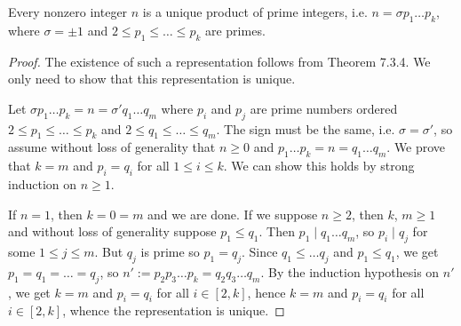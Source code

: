\begin{thmbox}
   Every nonzero integer $n$ is a unique product of prime integers, i.e. $n = \sigma p_1\dots p_k$, where $\sigma = \pm 1$ and $2 \leq p_1 \leq \dots \leq p_k$ are primes.
\end{thmbox}
\begin{proof}
   The existence of such a representation follows from Theorem 7.3.4. We only need to show that this representation is unique. 

   Let $\sigma p_1 \dots p_k = n = \sigma' q_1 \dots q_m$ where $p_i$ and $p_j$ are prime numbers ordered $2 \leq p_1 \leq \dots \leq p_k$ and $2 \leq q_1 \leq \dots \leq q_m$. The sign must be the same, i.e. $\sigma = \sigma'$, so assume without loss of generality that $n \geq 0$ and $p_1 \dots p_k = n = q_1 \dots q_m$. We prove that $k = m$ and $p_i = q_i$ for all $1 \leq i \leq k$. We can show this holds by strong induction on $n \geq 1$.

   If $n = 1$, then $k = 0 = m$ and we are done. If we suppose $n \geq 2$, then $k$, $m \geq 1$ and without loss of generality suppose $p_1 \leq q_1$. Then $p_1 \mid q_1 \dots q_m$,  so $p_i \mid q_j$ for some $1 \leq j \leq m$. But $q_j$ is prime so $p_1 = q_j$. Since $q_1 \leq \dots q_j$ and $p_1 \leq q_1$, we get $p_1 = q_1 = \dots = q_j$, so $n' := p_2p_3\dots p_k = q_2q_3 \dots q_m$. By the induction hypothesis on $n'$, we get $k = m$ and $p_i = q_i$ for all $i \in [2, k]$, hence $k = m$ and $p_i = q_i$ for all $i \in [2,k]$, whence the representation is unique.
\end{proof}

